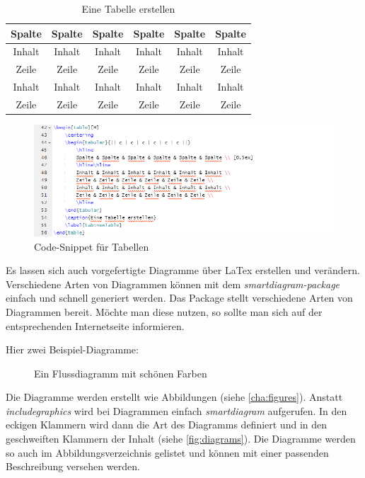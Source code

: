\begin{table}[H]
	\centering
	\begin{tabular}{|| c | c | c | c | c | c ||}
	    \hline
		Spalte & Spalte & Spalte & Spalte & Spalte & Spalte \\ [0.5ex]
		\hline\hline
		Inhalt & Inhalt & Inhalt & Inhalt & Inhalt & Inhalt \\
		Zeile & Zeile & Zeile & Zeile & Zeile & Zeile \\
		Inhalt & Inhalt & Inhalt & Inhalt & Inhalt & Inhalt \\
		Zeile & Zeile & Zeile & Zeile & Zeile & Zeile \\
		\hline
	\end{tabular}
	\caption{Eine Tabelle erstellen}
	\label{tab:newTable}
\end{table}

\begin{figure}[H]
    \centering
    \includegraphics[width=\textwidth]{03_GraphicFiles/TabellenErstellen.PNG}
    \caption{Code-Snippet für Tabellen}
    \label{fig:createTable}
\end{figure}

Es lassen sich auch vorgefertigte Diagramme über LaTex erstellen und verändern. Verschiedene Arten von Diagrammen können mit dem \emph{smartdiagram-package} einfach und schnell generiert werden. Das Package stellt verschiedene Arten von Diagrammen bereit. Möchte man diese nutzen, so sollte man sich auf der entsprechenden Internetseite informieren. 

Hier zwei Beispiel-Diagramme:
\begin{figure}[H]
    \centering
    \caption{Ein Flussdiagramm mit schönen Farben}
    \label{fig:flowdiagram}
\end{figure}

Die Diagramme werden erstellt wie Abbildungen (siehe \ref{cha:figures}). Anstatt \emph{includegraphics} wird bei Diagrammen einfach \emph{smartdiagram} aufgerufen. In den eckigen Klammern wird dann die Art des Diagramms definiert und in den geschweiften Klammern der Inhalt (siehe \ref{fig:diagrams}). Die Diagramme werden so auch im Abbildungsverzeichnis gelistet und können mit einer passenden Beschreibung versehen werden.

